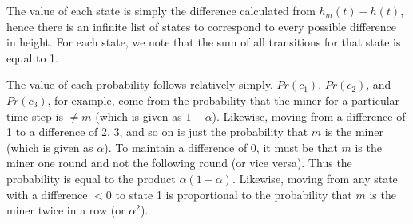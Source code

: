 \documentclass[12pt]{article}%
\begin{document}
The value of each state is simply the difference calculated from $h_{m}(t) - h(t)$, hence there is an infinite list of states to correspond to every possible difference in height. For each state, we note that the sum of all transitions for that state is equal to 1.

The value of each probability follows relatively simply. $Pr(c_1)$, $Pr(c_2)$, and $Pr(c_3)$, for example, come from the probability that the miner for a particular time step is $\neq m$ (which is given as $1 - \alpha$). Likewise, moving from a difference of 1 to a difference of 2, 3, and so on is just the probability that $m$ is the miner (which is given as $\alpha$). To maintain a difference of 0, it must be that $m$ is the miner one round and not the following round (or vice versa). Thus the probability is equal to the product $\alpha (1 - \alpha)$. Likewise, moving from any state with a difference $< 0$ to state 1 is proportional to the probability that $m$ is the miner twice in a row (or $\alpha^2$).
\end{document}
